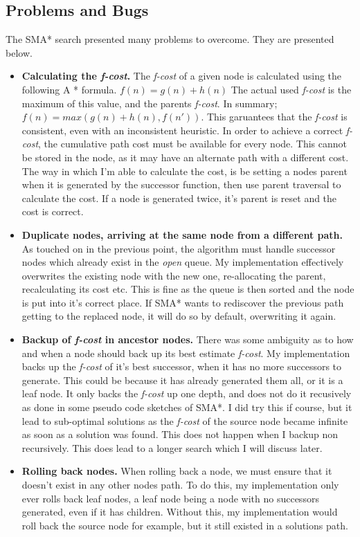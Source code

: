 \documentclass[]{article}
\begin{document}
\subsection*{Problems and Bugs}
The SMA* search presented many problems to overcome. They are presented below.
\begin{itemize}
	\item \textbf{Calculating the \textit{f-cost}.} The \textit{f-cost} of a given node is calculated using the following A * formula. $ f(n) = g(n) + h(n) $ The actual used \textit{f-cost} is the maximum of this value, and the parents \textit{f-cost}. In summary; $ f(n)= max(g(n) + h(n), f(n'))$. This garuantees that the \textit{f-cost} is consistent, even with an inconsistent heuristic.
	In order to achieve a correct \textit{f-cost}, the cumulative path cost must be available for every node. This cannot be stored in the node, as it may have an alternate path with a different cost. The way in which I'm able to calculate the cost, is be setting a nodes parent when it is generated by the successor function, then use parent traversal to calculate the cost. If a node is generated twice, it's parent is reset and the cost is correct.
	\item \textbf{Duplicate nodes, arriving at the same node from a different path.} As touched on in the previous point, the algorithm must handle successor nodes which already exist in the \textit{open} queue. My implementation effectively overwrites the existing node with the new one, re-allocating the parent, recalculating its cost etc. This is fine as the queue is then sorted and the node is put into it's correct place. If SMA* wants to rediscover the previous path getting to the replaced node, it will do so by default, overwriting it again.
	\item \textbf{Backup of \textit{f-cost} in ancestor nodes.} There was some ambiguity as to how and when a node should back up its best estimate \textit{f-cost}. My implementation backs up the \textit{f-cost} of it's best successor, when it has no more successors to generate. This could be because it has already generated them all, or it is a leaf node. It only backs the \textit{f-cost} up one depth, and does not do it recusively as done in some pseudo code sketches of SMA*. I did try this if course, but it lead to sub-optimal solutions as the \textit{f-cost} of the source node became infinite as soon as a solution was found. This does not happen when I backup non recursively. This does lead to a longer search which I will discuss later.
	\item \textbf{Rolling back nodes.} When rolling back a node, we must ensure that it doesn't exist in any other nodes path. To do this, my implementation only ever rolls back leaf nodes, a leaf node being a node with no successors generated, even if it has children. Without this, my implementation would roll back the source node for example, but it still existed in a solutions path.

\end{itemize}
\end{document}
